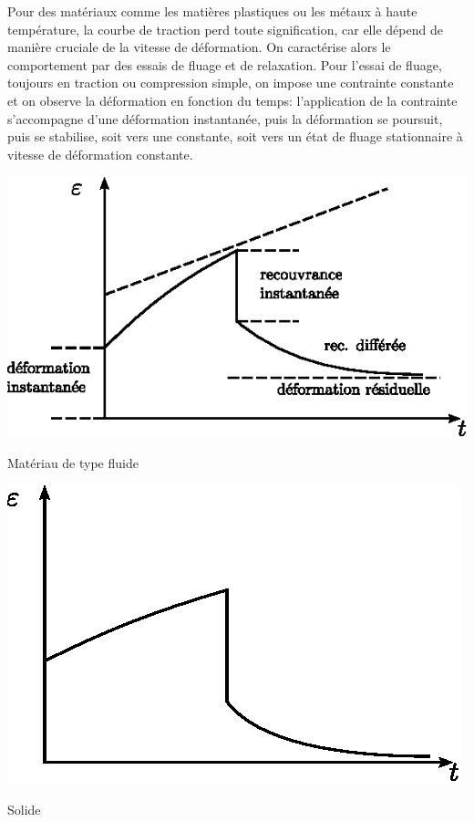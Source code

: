 Pour des matériaux comme les matières plastiques ou les métaux à haute température, la courbe de traction perd toute signification, car elle dépend de manière cruciale de la vitesse de déformation.
On caractérise alors le comportement par des essais de fluage et de relaxation.
Pour l'essai de fluage, toujours en traction ou compression simple, on impose une contrainte constante et on observe la déformation en fonction du temps: l'application de la contrainte s'accompagne d'une déformation instantanée, puis la déformation se poursuit, puis se stabilise, soit vers une constante, soit vers un état de fluage stationnaire à vitesse de déformation constante.
\begin{multicols}{2}
    \begin{center}
        \includegraphics{../images/T1_Ch04-0017}

        Matériau de type fluide
    \end{center}
    \columnbreak
    \begin{center}
        \includegraphics{../images/T1_Ch04-0018}

        Solide
    \end{center}
\end{multicols}
